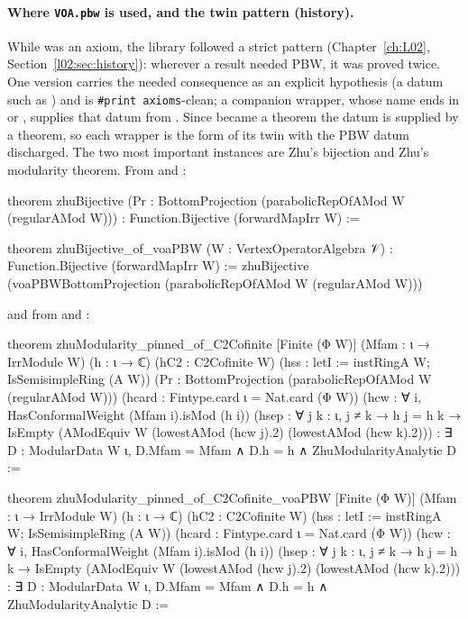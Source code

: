 \paragraph{Where \texorpdfstring{\texttt{VOA.pbw}}{VOA.pbw} is used, and the twin pattern (history).}
While  was an axiom, the library followed a strict pattern (Chapter~\ref{ch:L02},
Section~\ref{l02:sec:history}): wherever a result needed PBW, it was proved twice. One version carries the needed consequence as an explicit hypothesis (a
datum such as ) and is \texttt{\#print axioms}-clean; a companion
wrapper, whose name ends in  or , supplies that datum from
. Since  became a theorem the datum is supplied by a theorem, so each
 wrapper is the form of its twin with the PBW datum discharged. The two most
important instances are Zhu's bijection and Zhu's modularity theorem. From  and
:
\begin{leancode}
theorem zhuBijective (Pr : BottomProjection (parabolicRepOfAMod W (regularAMod W))) :
    Function.Bijective (forwardMapIrr W) :=

theorem zhuBijective_of_voaPBW (W : VertexOperatorAlgebra 𝒱) :
    Function.Bijective (forwardMapIrr W) :=
  zhuBijective
    (voaPBWBottomProjection (parabolicRepOfAMod W (regularAMod W)))
\end{leancode}
and from  and :
\begin{leancode}
theorem zhuModularity_pinned_of_C2Cofinite [Finite (Φ W)]
    (Mfam : ι → IrrModule W) (h : ι → ℂ)
    (hC2 : C2Cofinite W)
    (hss : letI := instRingA W; IsSemisimpleRing (A W))
    (Pr : BottomProjection (parabolicRepOfAMod W (regularAMod W)))
    (hcard : Fintype.card ι = Nat.card (Φ W))
    (hcw : ∀ i, HasConformalWeight (Mfam i).isMod (h i))
    (hsep : ∀ j k : ι, j ≠ k → h j = h k →
      IsEmpty (AModEquiv W (lowestAMod (hcw j).2) (lowestAMod (hcw k).2))) :
    ∃ D : ModularData W ι, D.Mfam = Mfam ∧ D.h = h ∧ ZhuModularityAnalytic D :=

theorem zhuModularity_pinned_of_C2Cofinite_voaPBW [Finite (Φ W)]
    (Mfam : ι → IrrModule W) (h : ι → ℂ)
    (hC2 : C2Cofinite W)
    (hss : letI := instRingA W; IsSemisimpleRing (A W))
    (hcard : Fintype.card ι = Nat.card (Φ W))
    (hcw : ∀ i, HasConformalWeight (Mfam i).isMod (h i))
    (hsep : ∀ j k : ι, j ≠ k → h j = h k →
      IsEmpty (AModEquiv W (lowestAMod (hcw j).2) (lowestAMod (hcw k).2))) :
    ∃ D : ModularData W ι, D.Mfam = Mfam ∧ D.h = h ∧ ZhuModularityAnalytic D :=
\end{leancode}

